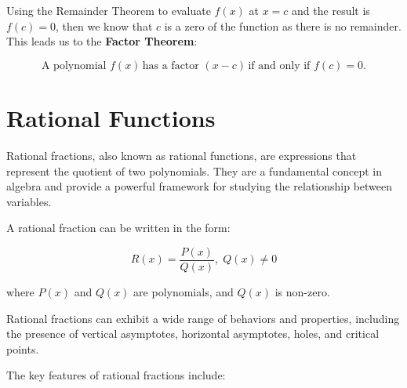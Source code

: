 \documentclass[11pt]{article}
\begin{document}
Using the Remainder Theorem to evaluate $f(x)$ at $x = c$ and the result is $f(c) = 0$, then we know that $c$ is a zero of the function as there is no remainder. This leads us to the \textbf{Factor Theorem}:

\begin{center}
\begin{equation*}
\textrm{A polynomial } f(x) \, \textrm{has a factor } (x - c) \, \textrm{if and only if } f(c) = 0.
\end{equation*}
\end{center}

\section{Rational Functions}

Rational fractions, also known as rational functions, are expressions that represent the quotient of two polynomials. They are a fundamental concept in algebra and provide a powerful framework for studying the relationship between variables.

A rational fraction can be written in the form:

\[
R(x) = \frac{P(x)}{Q(x)},\; Q(x) \neq 0
\]

where $P(x)$ and $Q(x)$ are polynomials, and $Q(x)$ is non-zero.

Rational fractions can exhibit a wide range of behaviors and properties, including the presence of vertical asymptotes, horizontal asymptotes, holes, and critical points.

The key features of rational fractions include:
\end{document}
